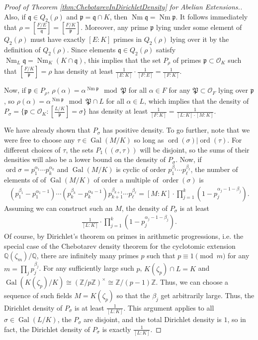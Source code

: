 \documentclass[12pt]{amsart}
\theoremstyle{definition}
\theoremstyle{remark}
\numberwithin{equation}{section}
\newcommand{\cO}{\mathcal O}
\newcommand{\fkp}{\mathfrak p}
\newcommand{\fkq}{\mathfrak q}
\newcommand{\fkP}{\mathfrak{P}}
\newcommand{\bbQ}{\mathbb Q}
\newcommand{\bbZ}{\mathbb Z}
\DeclareMathOperator{\norm}{Nm}
\newcommand{\artin}[2]{\left[ \frac{#1}{#2}\right]}
\DeclareMathOperator{\Gal}{Gal}
\DeclareMathOperator{\ord}{ord}
\DeclareMathOperator{\order}{order}
\begin{document}
\begin{proof}[Proof of Theorem \ref{thm:ChebotarevInDirichletDensity} for Abelian Extensions.]
Also, if $\fkq \in Q_{2}(\rho)$ and $\fkp = \fkq \cap K$, then $\norm \fkq = \norm \fkp$. It follows immediately that $\rho = \artin{F/E}{\fkq} = \artin{F/K}{\fkp}$. Moreover, any prime $\fkp$ lying under some element of $Q_2(\rho)$ must have exactly $[E:K]$ primes in $Q_{2}(\rho)$ lying over it by the definition of $Q_2(\rho)$. Since elements $\fkq \in Q_{2}(\rho)$ satisfy $\norm_{L} \fkq = \norm_{K}(K \cap \fkq)$, this implies that the set $P_{\rho}$ of primes $\fkp \subset \cO_{K}$ such that $\artin{F/K}{\fkp} = \rho$ has density at least $\frac{1}{[E:K]} \cdot\frac{1}{[F:E]} = \frac{1}{[F:K]}$. 

 Now, if $\fkp \in P_{\rho}$, $\rho(\alpha) = \alpha^{\norm \fkp} \mod \fkP$ for all $\alpha \in F$ for any $\fkP \subset \cO_{F}$ lying over $\fkp$, so $\rho(\alpha) = \alpha^{\norm \fkp} \mod \fkP \cap L$ for all $\alpha \in L$, which implies that the density of $P_{\sigma} = \{\fkp \subset \cO_{K}: \artin{L/K}{\fkp} = \sigma\}$ has density at least $\frac{1}{[F:K]} = \frac{1}{[L:K] \cdot [M:K]}$. 
 
 We have already shown that $P_{\sigma}$ has positive density. To go further, note that we were free to choose any $\tau \in \Gal(M/K)$ so long as $\ord(\sigma)|\ord(\tau)$. For different choices of $\tau$, the sets $P_{1}((\sigma, \tau))$ will be disjoint, so the sums of their densities will also be a lower bound on the density of $P_{\sigma}$.
 Now, if $\ord \sigma = p_1^{\alpha_1} \cdots p_{k}^{\alpha_{k}}$ and $\Gal(M/K)$ is cyclic of order $p_1^{\beta_1} \cdots p_{\ell}^{\beta_{\ell}}$, the number of elements of of $\Gal(M/K)$ of order a multiple of $\order(\sigma)$ is 
 \begin{align}
 (p_1^{\beta_1} - p_{1}^{\alpha_{1} - 1}) \cdots 
(p_k^{\beta_k} - p_{k}^{\alpha_{k} - 1}) p_{k+1}^{\beta_{k+1}} \cdots p_{\ell}^{\beta_{\ell}} = [M:K] \cdot \prod_{j=1}^{k}(1 - p_{j}^{\alpha_{j} - 1 - \beta_{j}}).
\end{align}
Assuming we can construct such an $M$, the density of $P_{\sigma}$ is at least 
\begin{align}\frac{1}{[L:K]} \cdot \prod_{j=1}^{k}(1 - p_{j}^{\alpha_{j} - 1 - \beta_{j}}).\end{align}
 Of course, by Dirichlet's theorem on primes in arithmetic progressions, i.e. the special case of the Chebotarev density theorem for the cyclotomic extension $\bbQ(\zeta_{m})/\bbQ$, there are infinitely many primes $p$ such that $p \equiv 1 \pmod{m}$ for any $m = \prod_{j} p_{j}^{\beta_{j}}$. For any sufficiently large such $p$, $K(\zeta_{p}) \cap L = K$ and $\Gal(K(\zeta_{p})/K) \cong (\bbZ/p\bbZ)^\times \cong \bbZ/(p-1)\bbZ$. Thus, we can choose a sequence of such fields $M = K(\zeta_{p})$ so that the $\beta_{j}$ get arbitrarily large. Thus, the Dirichlet density of $P_{\sigma}$ is at least $\frac{1}{[L:K]}$.
 This argument applies to all $\sigma \in \Gal(L/K)$, the $P_{\sigma}$ are disjoint, and the total Dirichlet density is $1$, so in fact, the Dirichlet density of $P_{\sigma}$ is exactly $\frac{1}{[L:K]}$.
\end{proof}
\end{document}
